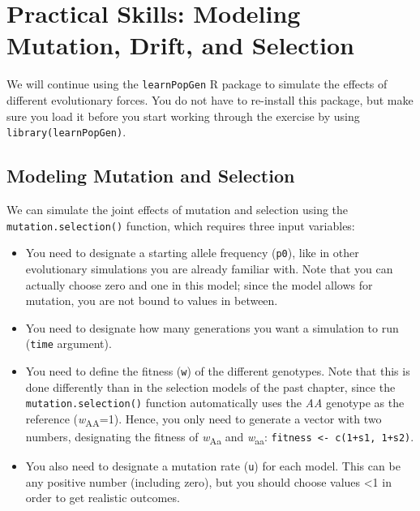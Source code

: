\documentclass[
]{book}
\begin{document}
\hypertarget{practical-skills-modeling-mutation-drift-and-selection}{%
\section{Practical Skills: Modeling Mutation, Drift, and Selection}\label{practical-skills-modeling-mutation-drift-and-selection}}

We will continue using the \texttt{learnPopGen} R package to simulate the effects of different evolutionary forces. You do not have to re-install this package, but make sure you load it before you start working through the exercise by using \texttt{library(learnPopGen)}.

\hypertarget{modeling-mutation-and-selection}{%
\subsection{Modeling Mutation and Selection}\label{modeling-mutation-and-selection}}

We can simulate the joint effects of mutation and selection using the \texttt{mutation.selection()} function, which requires three input variables:

\begin{itemize}
\item
  You need to designate a starting allele frequency (\texttt{p0}), like in other evolutionary simulations you are already familiar with. Note that you can actually choose zero and one in this model; since the model allows for mutation, you are not bound to values in between.
\item
  You need to designate how many generations you want a simulation to run (\texttt{time} argument).
\item
  You need to define the fitness (\texttt{w}) of the different genotypes. Note that this is done differently than in the selection models of the past chapter, since the \texttt{mutation.selection()} function automatically uses the \emph{AA} genotype as the reference (\emph{w}\textsubscript{AA}=1). Hence, you only need to generate a vector with two numbers, designating the fitness of \emph{w}\textsubscript{Aa} and \emph{w}\textsubscript{aa}: \texttt{fitness\ \textless{}-\ c(1+s1,\ 1+s2)}.
\item
  You also need to designate a mutation rate (\texttt{u}) for each model. This can be any positive number (including zero), but you should choose values \textless1 in order to get realistic outcomes.
\end{itemize}
\end{document}
